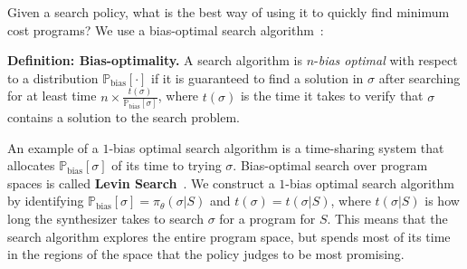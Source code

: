 \documentclass{article}
\newcommand{\probability}{\mathds{P}} %
\theoremstyle{definition}
\begin{document}
Given a search policy, what is the best way of using it to quickly find minimum cost programs?
We use a bias-optimal search algorithm~\citep{schmidhuber2004optimal}:

\noindent\textbf{Definition: Bias-optimality.} 
   A search algorithm is $n$-\emph{bias optimal}
with respect to a distribution $\probability_{\text{bias}}[\cdot ]$ if it is
guaranteed to find a solution in $\sigma $ after searching for at least time
$n\times\frac{t(\sigma )}{\probability_{\text{bias}}[\sigma ]}$, where $t(\sigma )$ is the time it
takes to verify that $\sigma $ contains a solution to the
search problem.




An example of a $1$-bias optimal search algorithm is a time-sharing system that allocates $\probability_{\text{bias}}[\sigma ]$ of its time to trying $\sigma $. Bias-optimal search over program spaces is called \textbf{Levin Search}~\cite{levin1973universal}. We construct a $1$-bias optimal search algorithm by identifying $\probability_{\text{bias}}[\sigma ] = \pi_\theta(\sigma |S)$ and $t(\sigma )  = t(\sigma|S)$, where $t(\sigma|S)$ is how long the synthesizer takes to search $\sigma $ for a program for $S$. This means that the search algorithm explores the entire program space, but spends most of its time in the regions of the space that  the policy judges to be most promising.
\end{document}
